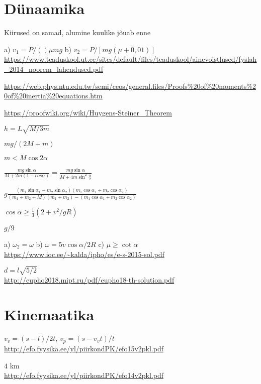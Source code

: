 \documentclass[a4paper,11pt,twocolumn]{article}
\begin{document}
\section{Dünaamika}
\begin{solutions}
	\item Kiirused on samad, alumine kuulike jõuab enne
	\item a) \( v_1={P}/()\mu mg \) b) \( v_2={P}/[mg(\mu+0,01)] \) \\ \url{https://www.teaduskool.ut.ee/sites/default/files/teaduskool/ainevoistlused/fyslah_2014_noorem_lahendused.pdf}
	\item 
	\item \url{https://web.phys.ntu.edu.tw/semi/ceos/general.files/Proofs%20of%20moments%20of%20inertia%20equations.htm}
	\item 
	\item 
	\item \url{https://proofwiki.org/wiki/Huygens-Steiner_Theorem}
	\item \( h=L\sqrt{M/3m} \)
	\item \( {mg}/(2M+m) \)
	\item \( m<M\cos 2\alpha \)
	\item \(\frac{mg\sin\alpha}{M+2m(1-cos\alpha)}=\frac{mg\sin\alpha}{M+4m\sin^2 \frac{\alpha}{2}} \)
	\item \( g\frac{(m_1\sin\alpha_1-m_2\sin\alpha_2)(m_1\cos\alpha_1+m_2\cos\alpha_2)}{(m_1+m_2+M)(m_1+m_2)-(m_1\cos\alpha_1+m_2\cos\alpha_2)} \)
	\item \( \cos\alpha \ge \frac{1}{3}(2+{v^2}/{gR}) \)
	\item \( g/9 \)
	\item a) \( \omega_2=\omega \) b) \( \omega=5v\cos\alpha/2R \) c) \( \mu \ge \cot \alpha \)
	\url{https://www.ioc.ee/~kalda/ipho/es/e-s-2015-sol.pdf}
	\item \( d=l\sqrt{5/2} \) \\
	\url{http://eupho2018.mipt.ru/pdf/eupho18-th-solution.pdf}
\end{solutions}

\section{Kinemaatika}
\begin{solutions}
	\item \( v_v=(s-l)/2t \), \( v_p=(s-v_vt)/t \) \\ \url{http://efo.fyysika.ee/yl/piirkondPK/efo15v2pkl.pdf}
	\item \( 4 \) km \\ \url{http://efo.fyysika.ee/yl/piirkondPK/efo14v2pkl.pdf}
	\item 
\end{solutions}
\end{document}
